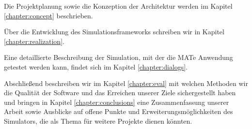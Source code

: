 Die Projektplanung sowie die Konzeption der Architektur werden im Kapitel \ref{chapter:concept} beschrieben.

Über die Entwicklung des Simulationsframeworks schreiben wir in Kapitel \ref{chapter:realization}.

Eine detaillierte Beschreibung der Simulation, mit der die MATe Anwendung getestet werden kann, findet sich im Kapitel \ref{chapter:dialogs}.

Abschließend beschreiben wir im Kapitel \ref{chapter:eval} mit welchen Methoden wir die Qualität der Software und das Erreichen unserer Ziele sichergestellt haben und bringen in Kapitel \ref{chapter:conclusions} eine Zusammenfassung unserer Arbeit sowie Ausblicke auf offene Punkte und Erweiterungsmöglichkeiten des Simulators, die als Thema für weitere Projekte dienen könnten.


